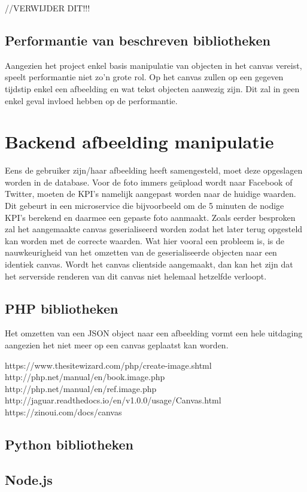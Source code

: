 //VERWIJDER DIT!!!
\subsection{Performantie van beschreven bibliotheken}
Aangezien het project enkel basis manipulatie van objecten in het canvas vereist, speelt performantie niet zo'n grote rol. Op het canvas zullen op een gegeven tijdstip enkel een afbeelding en wat tekst objecten aanwezig zijn. Dit zal in geen enkel geval invloed hebben op de performantie. 


\newpage
\section{Backend afbeelding manipulatie}
Eens de gebruiker zijn/haar afbeelding heeft samengesteld, moet deze opgeslagen worden in de database. Voor de foto immers ge\"{u}pload wordt naar Facebook of Twitter, moeten de KPI's namelijk aangepast worden naar de huidige waarden. Dit gebeurt in een microservice die bijvoorbeeld om de 5 minuten de nodige KPI's berekend en daarmee een gepaste foto aanmaakt. Zoals eerder besproken zal het aangemaakte canvas geserialiseerd worden zodat het later terug opgesteld kan worden met de correcte waarden. Wat hier vooral een probleem is, is de nauwkeurigheid van het omzetten van de geserialiseerde objecten naar een identiek canvas. Wordt het canvas clientside aangemaakt, dan kan het zijn dat het serverside renderen van dit canvas niet helemaal hetzelfde verloopt. 

\subsection{PHP bibliotheken}
Het omzetten van een JSON object naar een afbeelding vormt een hele uitdaging aangezien het niet meer op een canvas geplaatst kan worden. 

https://www.thesitewizard.com/php/create-image.shtml
http://php.net/manual/en/book.image.php
http://php.net/manual/en/ref.image.php
http://jaguar.readthedocs.io/en/v1.0.0/usage/Canvas.html
https://zinoui.com/docs/canvas




\subsection{Python bibliotheken}

\subsection{Node.js}

